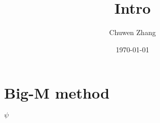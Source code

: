 \documentclass[main]{subfiles}
\title{Intro}
\author{Chuwen Zhang}
\date{\today}
\begin{document}
\maketitle
{
    \setcounter{tocdepth}{3}
    \tableofcontents
}
\section{Big-M method}

\(\psi\)
\end{document}
